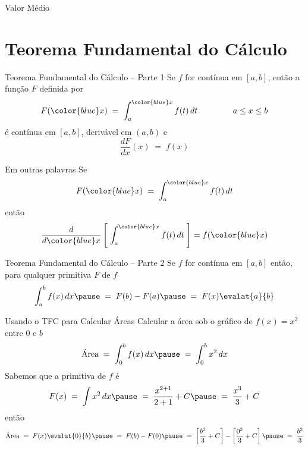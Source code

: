 \begin{frame}{Valor Médio}
  \centering
  \vspace{\baselineskip}
  
\end{frame}

\section{Teorema Fundamental do Cálculo}

\begin{frame}{Teorema Fundamental do Cálculo -- Parte 1}
  Se $f$ for {\color{blue} contínua} em $[a, b]$,
  \pause
  então a função $F$ definida por
  \[
    F({\color{blue}x})
    \;=\; \int_a^{{\color{blue}x}} f(t)\,dt
    \hspace{15mm} a \leq x \leq b
  \]
  \pause
  é contínua em $[a, b]$,
  \pause
  derivável em $(a, b)$
  \pause
  e
  \[
    \frac{dF}{dx}(x) \;=\; f(x)
  \]
\end{frame}

\begin{frame}{Em outras palavras}
  Se
  \[
    F({\color{blue}x})
    \;=\; \int_a^{{\color{blue}x}} f(t)\,dt
  \]
  \pause
  então
  \[
    \frac{d}{d{\color{blue}x}}
    \left[\; \int_a^{{\color{blue}x}} f(t)\,dt \;\right]
    = f({\color{blue}x})
  \]
\end{frame}

\begin{frame}{Teorema Fundamental do Cálculo -- Parte 2}
  Se $f$ for {\color{blue} contínua} em $[a, b]$
  \pause
  então, para {\color{blue}qualquer primitiva} $F$ de $f$
  \[
    \int_a^b f(x) \,dx      \pause
    \;=\; F(b) - F(a)       \pause
    \;=\; F(x) \evalat{a}{b}
  \]
\end{frame}

\begin{frame}{Usando o TFC para Calcular Áreas}
  Calcular a área sob o gráfico de \(f(x)=x^2\) entre 0 e $b$
  \pause
  \[
    \text{Área}
    \;=\; \int_0^b f(x) \,dx \pause
    \;=\; \int_0^b x^2  \,dx
  \]
  \pause
  Sabemos que a primitiva de $f$ é
  \[
    F(x)
    \;=\; \int x^2  \,dx \pause
    \;=\; \frac{x^{2+1}}{2+1} + C \pause
    \;=\; \frac{x^3}{3} + C
  \]
  \pause
  então
  \[
    \text{Área}
    \;=\; F(x) \evalat{0}{b} \pause
    \;=\; F(b) - F(0)        \pause
    \;=\; \left[ \frac{b^3}{3} + C \right]
      -   \left[ \frac{0^3}{3} + C \right] \pause
    \;=\; \frac{b^3}{3}
  \]
\end{frame}

